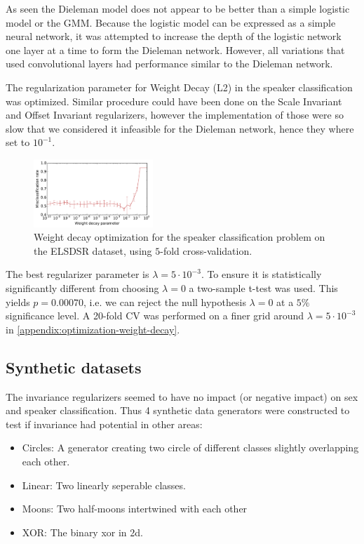 As seen the Dieleman model does not appear to be better than a simple logistic model or the GMM. Because the logistic model can be expressed as a simple neural network, it was attempted to increase the depth of the logistic network one layer at a time to form the Dieleman network. However, all variations that used convolutional layers had performance similar to the Dieleman network.

The regularization parameter for Weight Decay (L2) in the speaker classification was optimized. Similar procedure could have been done on the Scale Invariant and Offset Invariant regularizers, however the implementation of those were so slow that we considered it infeasible for the Dieleman network, hence they where set to $10^{-1}$.

\begin{figure}[H]
  \centering
  \includegraphics[width=0.4\textwidth]{plots/reg_opt_dieleman_speaker_elsdsr}
  \caption{Weight decay optimization for the speaker classification problem on the ELSDSR dataset, using $5$-fold cross-validation.}
  \label{fig:reg_opt}
\end{figure}

The best regularizer parameter is $\lambda = 5 \cdot 10^{-3}$. To ensure it is statistically significantly different from choosing $\lambda = 0$ a two-sample t-test was used. This yields $p = 0.00070$, i.e. we can reject the null hypothesis $\lambda=0$ at a $5\%$ significance level. A 20-fold CV was performed on a finer grid around $\lambda = 5 \cdot 10^{-3}$ in \cref{appendix:optimization-weight-decay}.

\subsection{Synthetic datasets}

The invariance regularizers seemed to have no impact (or negative impact) on sex and speaker classification. Thus 4 synthetic data generators were constructed to test if invariance had potential in other areas:
\begin{itemize}
\item{Circles: A generator creating two circle of different classes slightly overlapping each other.}
\item{Linear: Two linearly seperable classes.}
\item{Moons: Two half-moons intertwined with each other}
\item{XOR: The binary xor in 2d.}
\end{itemize}

